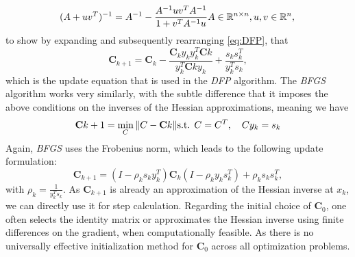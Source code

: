 \begin{equation}
    (A + uv^T)^{-1} = A^{-1} - \frac{A^{-1}uv^T A^{-1}}{1 + v^T A^{-1}u} \\ A \in \mathbb{R}^{n \times n},\\
    u, v \in \mathbb{R}^n,\\
\end{equation}
    to show by expanding and subsequently rearranging \ref{eq:DFP}, that
\begin{equation}
\mathbf{C}_{k+1} = \mathbf{C}_k - \frac{\mathbf{C}_k y_k y_k^T \mathbf{C}k}{y_k^T \mathbf{C}k y_k} + \frac{s_k s_k^T}{y_k^T s_k},
\end{equation}
which is the update equation that is used in the \emph{DFP} algorithm.
The \emph{BFGS} algorithm works very similarly, with the subtle difference that it imposes the above conditions on the inverses of the Hessian approximations, meaning we have
\begin{equation}
\mathbf{C}{k+1} = \min_{C} \|C - \mathbf{C}k\| \\\text{s.t. } C = C^T, \quad Cy_k = s_k
\end{equation}
Again, \emph{BFGS} uses the Frobenius norm, which leads to the following update formulation:
\begin{equation}
\mathbf{C}_{k+1} = (I - \rho_k s_k y_k^T)  \mathbf{C}_k(I - \rho_k y_k s_k^T) + \rho_k s_k s_k^T,
\end{equation}
with $\rho_k = \frac{1}{y_k^T s_k}$. As $\mathbf{C}_{k+1}$ is already an approximation of the Hessian inverse at 
$x_k$, we can directly use it for step calculation. Regarding the initial choice of $\mathbf{C}_0$, one often selects the identity matrix
or approximates the Hessian inverse using finite differences on the gradient, when computationally feasible.
As there is no universally effective initialization method for $\mathbf{C}_0$ across all optimization problems.


